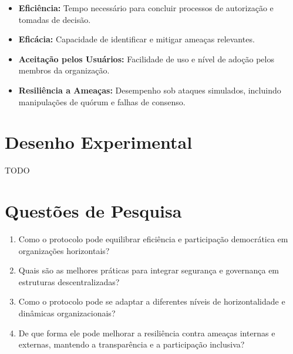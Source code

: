 \begin{itemize}
    \item \textbf{Eficiência:} Tempo necessário para concluir
processos de autorização e tomadas de decisão.
    \item \textbf{Eficácia:} Capacidade de identificar e mitigar
ameaças relevantes.
    \item \textbf{Aceitação pelos Usuários:} Facilidade de uso e nível
de adoção pelos membros da organização.
    \item \textbf{Resiliência a Ameaças:} Desempenho sob ataques
simulados, incluindo manipulações de quórum e falhas de consenso.
\end{itemize}

\section{Desenho Experimental}
\label{sec:experimental_design}

TODO

\section{Questões de Pesquisa}
\label{sec:research_questions}

\begin{enumerate}
    \item Como o protocolo pode equilibrar eficiência e participação
democrática em organizações horizontais?
    \item Quais são as melhores práticas para integrar segurança e
governança em estruturas descentralizadas?
    \item Como o protocolo pode se adaptar a diferentes níveis de
horizontalidade e dinâmicas organizacionais?
    \item De que forma ele pode melhorar a resiliência contra ameaças
internas e externas, mantendo a transparência e a participação
inclusiva?
\end{enumerate}


